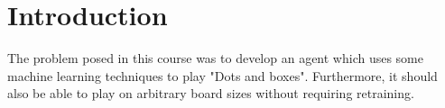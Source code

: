 \section{Introduction}

The problem posed in this course was to develop an agent which uses some machine learning techniques to play "Dots and boxes". Furthermore, it should also be able to play on arbitrary board sizes without requiring retraining.